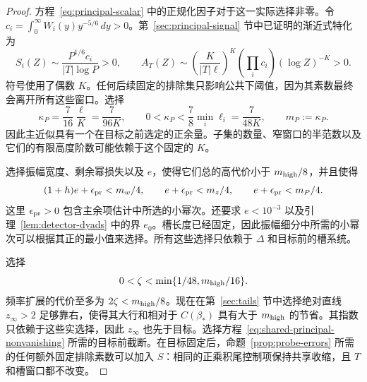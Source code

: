 \documentclass[11pt,a4paper]{article}
\numberwithin{equation}{section}
\numberwithin{figure}{section}
\theoremstyle{definition}
\theoremstyle{remark}
\begin{document}
\begin{proof}
方程~\eqref{eq:principal-scalar} 中的正规化因子对于这一实际选择非零。令 \(c_i=\int_0^\infty W_i(y)y^{-5/6}\,dy>0\)。第~\ref{sec:principal-signal} 节中已证明的渐近式特化为
\[
 S_i(Z)\sim\frac{P^{1/6}c_i}{|T|\log P}>0,\qquad
 A_T(Z)\sim
 \left(\frac{K}{|T|\ell}\right)^K
       \left(\prod_i c_i\right)(\log Z)^{-K}>0.
\]
符号使用了偶数 \(K\)。任何后续固定的排除集只影响公共下阈值，因为其素数最终会离开所有这些窗口。选择
\[
 \kappa_P=\frac7{16}\frac{\ell}{K}=\frac7{96K},
 \qquad 0<\kappa_P<\frac78\min_i\ell_i=\frac7{48K},
 \qquad m_P:=\kappa_P.
\]
因此主近似具有一个在目标之前选定的正余量。子集的数量、窄窗口的半范数以及它们的有限高度阶数可能依赖于这个固定的 \(K\)。

选择振幅宽度、剩余幂损失以及 \(e\)，使得它们总的高代价小于 \(m_{\rm high}/8\)，并且使得
\[
 (1+h)e+\epsilon_{\rm pr}<m_w/4,\qquad
 e+\epsilon_{\rm pr}<m_z/4,\qquad
 e+\epsilon_{\rm pr}<m_P/4.
\]
这里 \(\epsilon_{\rm pr}>0\) 包含主余项估计中所选的小幂次。还要求 \(e<10^{-3}\) 以及引理~\ref{lem:detector-dyads} 中的界 \(e_0\)。槽长度已经固定，因此振幅细分中所需的小幂次可以根据其正的最小值来选择。所有这些选择只依赖于 \(\Delta\) 和目标前的槽系统。

选择
\[
 0<\zeta<\min\{1/48,m_{\rm high}/16\}.
\]
频率扩展的代价至多为 \(2\zeta<m_{\rm high}/8\)。现在在第~\ref{sec:tails} 节中选择绝对直线 \(z_\infty>2\) 足够靠右，使得其大行和相对于 \(C(\beta_*)\) 具有大于 \(m_{\rm high}\) 的节省。其指数只依赖于这些实选择，因此 \(z_\infty\) 也先于目标。选择方程~\eqref{eq:shared-principal-nonvanishing} 所需的目标前截断。在目标固定后，命题~\ref{prop:probe-errors} 所需的任何额外固定排除素数可以加入 \(S\)：相同的正乘积尾控制项保持共享收缩，且 \(T\) 和槽窗口都不改变。


\end{proof}
\end{document}
